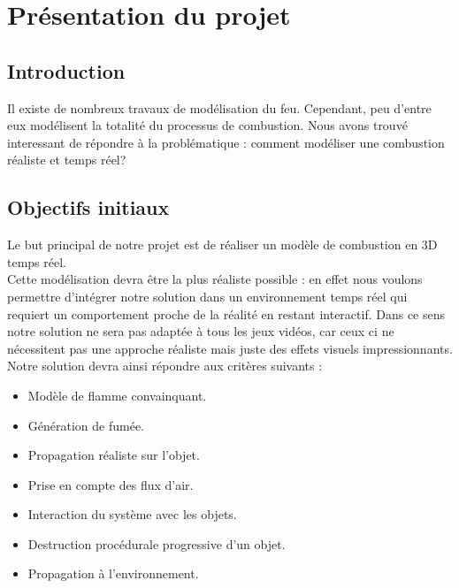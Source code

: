 \documentclass[a4paper,10pt]{article}
\begin{document}
\newpage

\tableofcontents

\newpage



\section{Présentation du projet}
\subsection{Introduction}
Il existe de nombreux travaux de modélisation du feu. Cependant, peu d'entre eux
modélisent la totalité du processus de combustion. Nous avons trouvé interessant
de répondre à la problématique : comment modéliser une combustion réaliste et temps réel?


\subsection{Objectifs initiaux}
Le but principal de notre projet est de réaliser un modèle de combustion en 3D temps
réel. \\
Cette modélisation devra être la plus réaliste possible : en
effet nous voulons permettre d'intégrer notre solution dans un
environnement temps réel qui requiert un comportement proche de la
réalité en restant interactif.
Dans ce sens notre solution ne sera pas adaptée à tous les jeux vidéos, car ceux ci ne nécessitent pas une
approche réaliste mais juste des effets visuels impressionnants.\\

Notre solution devra ainsi répondre aux critères suivants :
\begin{itemize}
\item Modèle de flamme convainquant. 
\item Génération de fumée.
\item Propagation réaliste sur l'objet. 
\item Prise en compte des flux d'air.
\item Interaction du système avec les objets.
\item Destruction procédurale progressive d'un objet.
\item Propagation à l'environnement.\\
\end{itemize}
\end{document}
